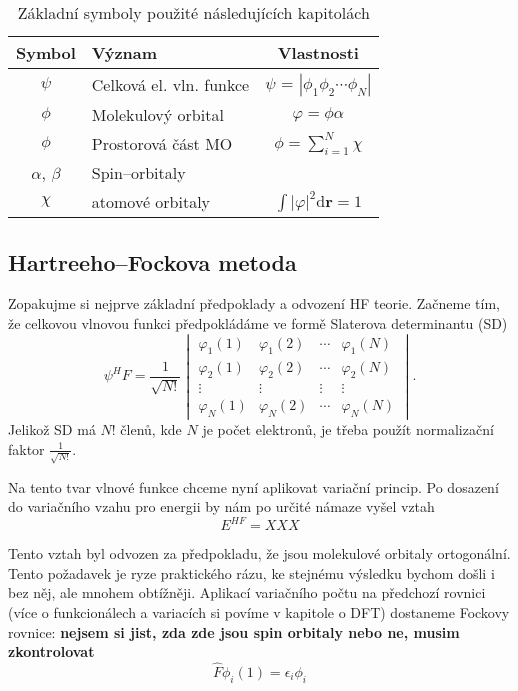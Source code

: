 \begin{table}[ht]
\centering
\caption{Základní symboly použité následujících kapitolách}
\begin{tabular}{|c|l|c|}
\hline 
\rule[-1ex]{0pt}{2.5ex} Symbol & 	Význam	& Vlastnosti \\ 
\hline 
\rule[-1ex]{0pt}{2.5ex} $\psi$ & Celková el. vln. funkce  & $\psi$ = $|\phi_1 \phi_2 \cdots \phi_N |$ \\ 
\hline 
\rule[-1ex]{0pt}{2.5ex} $\phi$ & Molekulový orbital & $\varphi=\phi \alpha $\\ 
\hline 
\rule[-1ex]{0pt}{2.5ex} $\phi$ & Prostorová část MO & $\phi=\sum_{i=1}^N \chi $ \\ 
\hline 
\rule[-1ex]{0pt}{2.5ex} $\alpha$, $\beta$  & Spin--orbitaly & \\ 
\hline 
\rule[-1ex]{0pt}{2.5ex} $\chi$ & atomové orbitaly & $\int |\varphi|^2 \mathrm{d}\textbf{r} = 1 $ \\
\hline
\end{tabular} 
\label{tab:vlnfunkce}
\end{table}

\subsection{Hartreeho--Fockova metoda}

Zopakujme si nejprve základní předpoklady a odvození HF teorie. Začneme tím, že celkovou vlnovou funkci předpokládáme ve formě Slaterova determinantu (SD)
\begin{equation}
\psi^HF=\frac{1}{\sqrt{N!}}\begin{vmatrix}
\varphi_1(1) & \varphi_1(2) & \cdots & \varphi_1(N) \\
\varphi_2(1) & \varphi_2(2) & \cdots & \varphi_2(N) \\
\vdots & \vdots & \vdots & \vdots \\
\varphi_N(1) & \varphi_N (2) & \cdots & \varphi_N(N)
\end{vmatrix}.
\end{equation}
Jelikož SD má $N!$ členů, kde $N$ je počet elektronů, je třeba použít normalizační faktor $\frac{1}{\sqrt{N!}}$.

Na tento tvar vlnové funkce chceme nyní aplikovat variační princip. Po dosazení do variačního vzahu pro energii by nám po určité námaze vyšel vztah
\begin{equation}
E^{HF}=  XXX 
\end{equation}

Tento vztah byl odvozen za předpokladu, že jsou molekulové orbitaly ortogonální. Tento požadavek je ryze praktického rázu, ke stejnému výsledku bychom došli i bez něj, ale mnohem obtížněji. Aplikací variačního počtu na předchozí rovnici (více o funkcionálech a variacích si povíme v kapitole o DFT) dostaneme Fockovy rovnice: \textbf{nejsem si jist, zda zde jsou spin orbitaly nebo ne, musim zkontrolovat}
\begin{equation}
\hat{F}\phi_i(1) = \epsilon_i \phi_i   
\end{equation}

